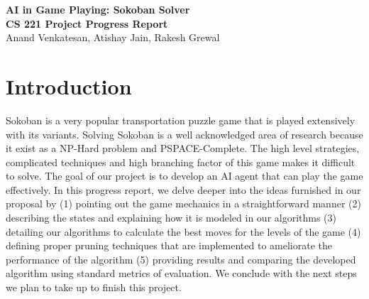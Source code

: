 \documentclass[10pt, final]{article}
\begin{document}
	\begin{center}
	\LARGE{\textbf{AI in Game Playing: Sokoban Solver}}\\
	\Large{\textbf{CS 221 Project Progress Report}}\\
	\Large{Anand Venkatesan, Atishay Jain, Rakesh Grewal }
\end{center}

\section{Introduction}
Sokoban is a very popular transportation puzzle game that is played extensively with its variants. Solving Sokoban is a well acknowledged area of research because it exist as a NP-Hard problem and PSPACE-Complete. The high level strategies, complicated techniques and high branching factor of this game makes it difficult to solve. The goal of our project is to develop an AI agent that can play the game effectively. In this progress report, we delve deeper into the ideas furnished in our proposal by (1) pointing out the game mechanics in a straightforward manner (2) describing the states and explaining how it is modeled in our algorithms (3) detailing our algorithms to calculate the best moves for the levels of the game (4) defining proper pruning techniques that are implemented to ameliorate the performance of the algorithm (5) providing results and comparing the developed algorithm using standard metrics of evaluation. We conclude with the next steps we plan to take up to finish this project.
\end{document}
